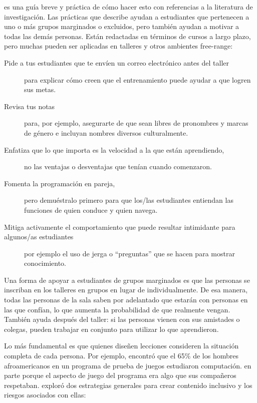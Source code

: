 \cite{Lee2017} es una guía breve y práctica de cómo hacer esto con referencias a la literatura de investigación.
Las prácticas que describe ayudan a estudiantes que pertenecen a uno o más grupos marginados o excluidos,
pero también ayudan a motivar a todas las demás personas.
Están redactadas en términos de cursos a largo plazo,
pero muchas pueden ser aplicadas en talleres y otros ambientes free-range:

\begin{description}

\item[Pide a tus estudiantes que te envíen un correo electrónico antes del taller]
  para explicar cómo creen que el entrenamiento puede ayudar a que logren sus metas.

\item[Revisa tus notas]
  para, por ejemplo, asegurarte de que sean libres de pronombres y marcas de género e incluyan nombres diversos culturalmente.

\item[Enfatiza que lo que importa es la velocidad a la que están aprendiendo,]
  no las ventajas o desventajas que tenían cuando comenzaron.

\item[Fomenta la programación en pareja,]
  pero demuéstralo primero para que los/las estudiantes entiendan las funciones de quien conduce y quien navega.

\item[Mitiga activamente el comportamiento que puede resultar intimidante para algunos/as estudiantes]
  por ejemplo el uso de jerga o ``preguntas'' que se hacen para mostrar conocimiento.

\end{description}

Una forma de apoyar a estudiantes de grupos marginados es
que las personas se inscriban en los talleres en grupos en lugar de individualmente.
De esa manera,
todas las personas de la sala saben por adelantado que estarán con personas en las que confían,
lo que aumenta la probabilidad de que realmente vengan.
También ayuda después del taller:
si las personas vienen con sus amistades o colegas,
pueden trabajar en conjunto para utilizar lo que aprendieron.

Lo más fundamental es que quienes diseñen lecciones
consideren la situación completa de cada persona.
Por ejemplo,
\cite{DiSa2014a} encontró que el 65\% de los hombres afroamericanos en un programa de prueba de juegos estudiaron computación.
en parte porque el aspecto de juego del programa era algo que sus compañeros respetaban.
\cite{Lach2018} exploró dos estrategias generales para crear contenido inclusivo y los riesgos asociados con ellas:

